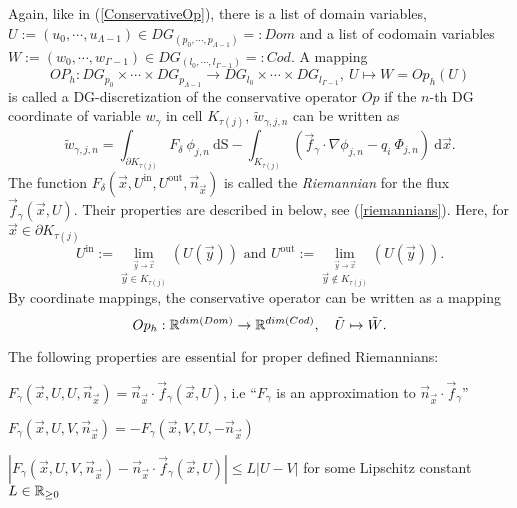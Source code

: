 \begin{myDef}
Again, like in (\ref{ConservativeOp}), there is
a list of domain variables,
$U := (u_0,\cdots,u_{\Lambda-1}) \in DG_{(p_0, \cdots, p_{\Lambda-1})} =: Dom$
and a list of codomain variables
$W := (w_0,\cdots,w_{\Gamma-1}) \in DG_{(l_0, \cdots, l_{\Gamma-1})} =: Cod$.
A mapping
\[
 OP_h :
 DG_{p_0} \times \cdots \times DG_{p_{\Lambda-1}}
 \rightarrow
 DG_{l_0} \times \cdots \times DG_{l_{\Gamma-1}},
 \
 U \mapsto W = Op_h(U)
\]
is called a DG-discretization of the conservative operator $Op$
if the $n$-th DG coordinate of variable $w_\gamma$ in cell $K_{\tau(j)}$, $\tilde{w}_{\gamma,j,n}$
can be written as
\[
  \tilde{w}_{\gamma,j,n} =
  \int_{\partial K_{\tau(j)}}
       F_\delta \ \phi_{j,n}
  \ \textrm{dS}
  -
  \int_{K_{\tau(j)}} \left(
       \vec{f}_\gamma \cdot \nabla \phi_{j,n}
       -
       q_i \ \Phi_{j,n}
  \right) \ \textrm{d}\vec{x}
  .
\]
The function $F_\delta(\vec{x},U^\textrm{in},U^\textrm{out},\vec{n}_\vec{x})$ is called the \emph{Riemannian}
for the flux $\vec{f}_\gamma(\vec{x},U)$. Their properties are described in below, see (\ref{riemannians}).
Here, for $\vec{x} \in \partial K_{\tau(j)}$
\[
  U^\textrm{in} := \lim_{\stackrel{\vec{y} \rightarrow \vec{x}}{\vec{y} \in K_{\tau(j)}}}(U(\vec{y}))
  \textrm{ and }
  U^\textrm{out} := \lim_{\stackrel{\vec{y} \rightarrow \vec{x}}{\vec{y} \notin K_{\tau(j)}}}(U(\vec{y}))
  .
\]
By coordinate mappings, the conservative operator can be written as a mapping
\[
  Op_h: \real^{dim(Dom)} \rightarrow \real^{dim(Cod)}, \quad \tilde{U} \mapsto \tilde{W}.
\]
\label{ConservativeOp_h}
\end{myDef}

\begin{myRem}[On Riemannians]
The following properties are essential for proper defined Riemannians:
\begin{packed_itemize}
  \item $F_\gamma(\vec{x},U,U,\vec{n}_{\vec{x}}) = \vec{n}_{\vec{x}} \cdot \vec{f}_\gamma(\vec{x},U)$,
  i.e ``$F_\gamma$ is an approximation to $\vec{n}_{\vec{x}} \cdot \vec{f}_\gamma$''
  \item $F_\gamma(\vec{x},U,V,\vec{n}_{\vec{x}}) = -F_\gamma(\vec{x},V,U,-\vec{n}_{\vec{x}})$
  \item $\left| F_\gamma(\vec{x},U,V,\vec{n}_{\vec{x}}) - \vec{n}_{\vec{x}} \cdot \vec{f}_\gamma(\vec{x},U) \right| \leq L | U-V |$
  for some Lipschitz constant $L \in \mathbb{R}_{\geq0}$
\end{packed_itemize}
\label{riemannians}
\end{myRem}


